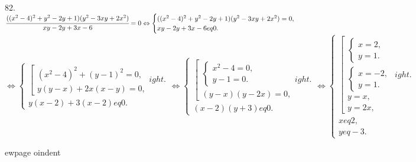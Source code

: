 82. $\cfrac{((x^2-4)^2+y^2-2y+1)(y^2-3xy+2x^2)}{xy-2y+3x-6}=0\Leftrightarrow
\begin{cases}

((x^2-4)^2+y^2-2y+1)(y^2-3xy+2x^2)=0,\\
xy-2y+3x-6
eq0.
\end{cases}$\\$\Leftrightarrow
\begin{cases}
\left[\begin{array}{l}
(x^2-4)^2+(y-1)^2=0,\\
y(y-x)+2x(x-y)=0,
\end{array}
ight.\\
y(x-2)+3(x-2)
eq0.
\end{cases}\Leftrightarrow
\begin{cases}
\left[\begin{array}{l}
\begin{cases}
x^2-4=0,\\
y-1=0.
\end{cases}\\
(y-x)(y-2x)=0,
\end{array}
ight.\\
(x-2)(y+3)
eq0.
\end{cases}\Leftrightarrow
\begin{cases}
\left[\begin{array}{l}
\begin{cases}
x=2,\\
y=1.
\end{cases}\\
\begin{cases}
x=-2,\\
y=1.
\end{cases}\\
y=x,\\
y=2x,
\end{array}
ight.\\
x
eq2,\\
y
eq-3.
\end{cases}$
\begin{figure}[ht!]
\end{figure}
ewpage
oindent
